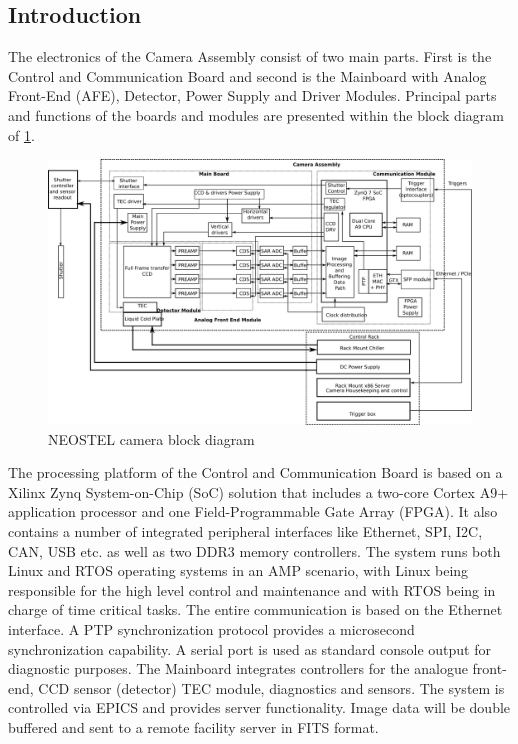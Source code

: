 \subsection{Introduction}

The electronics of the Camera Assembly consist of two main parts. First is the Control and Communication Board and second is the Mainboard with Analog Front-End (AFE), Detector, Power Supply and Driver Modules. 
Principal parts and functions of the boards and modules are presented within the block diagram of \ref{fig:cam_overview}. 

\begin{figure}[H]
\centering
\includegraphics[width=\textwidth]{pict/cam_overview.png}
\caption{NEOSTEL camera block diagram}
\label{fig:cam_overview}
\end{figure}

The processing platform of the Control and Communication Board is based on a Xilinx Zynq System-on-Chip (SoC) solution that includes a two-core Cortex A9+ application processor and one Field-Programmable Gate Array (FPGA). It also contains a number of integrated peripheral interfaces like Ethernet, SPI, I2C, CAN, USB etc. as well as two DDR3 memory controllers. 
The system runs both Linux and RTOS operating systems in an AMP scenario, with Linux being responsible for the high level control and maintenance and with RTOS being in charge of time critical tasks. The entire communication is based on the Ethernet interface. A PTP synchronization protocol provides a microsecond synchronization capability. A serial port is used as standard console output for diagnostic purposes.
The Mainboard integrates controllers for the analogue front-end, CCD sensor (detector) TEC module, diagnostics and sensors.
The system is controlled via EPICS and provides server functionality. Image data will be double buffered and sent to a remote facility server in FITS format.

